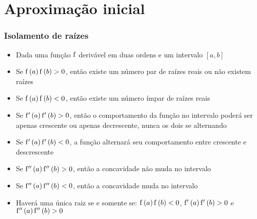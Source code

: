 \section{Aproximação inicial}

\begin{frame}
\frametitle{Isolamento de raízes}

\begin{itemize}
  \item Dada uma função $\mathrm{f}$ derivável em duas ordens e um intervalo $[a,b]$
  \item Se $\mathrm{f}\left(a\right) \mathrm{f}\left(b\right) > 0$, então existe um número par de raízes reais ou não existem raízes
  \item Se $\mathrm{f}\left(a\right) \mathrm{f}\left(b\right) < 0$, então existe um número ímpar de raízes reais
  \item Se $\mathrm{f}'\left(a\right) \mathrm{f}' \left(b\right) > 0$, então o comportamento da função no intervalo poderá ser apenas crescente ou apenas decrescente, nunca os dois se alternando
  \item Se $\mathrm{f}'\left(a\right) \mathrm{f}' \left(b\right) < 0$, a função alternará seu comportamento entre crescente e descrescente
  \item Se $\mathrm{f}''\left(a\right) \mathrm{f}'' \left(b\right) > 0$, então a concavidade não muda no intervalo
  \item Se $\mathrm{f}''\left(a\right) \mathrm{f}'' \left(b\right) < 0$, então a concavidade muda no intervalo
  \item Haverá uma única raiz se e somente se: $\mathrm{f}\left(a\right) \mathrm{f} \left(b\right) < 0$, $\mathrm{f}' \left(a\right) \mathrm{f}' \left(b\right) > 0$ e $\mathrm{f}'' \left(a\right) \mathrm{f}'' \left(b\right) > 0$
\end{itemize}
\end{frame}